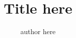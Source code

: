 \documentclass[12pt,notitlepage]{article}
\begin{document}
\title{Title here} \author{author here}
\maketitle

%
%
\end{document}
